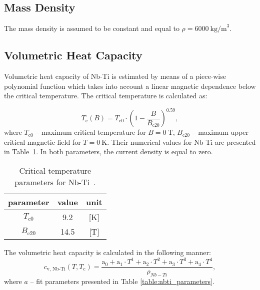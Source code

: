 
\subsection{Mass Density}
The mass density is assumed to be constant and equal to $\rho = 6000~\text{kg/m}^{3}$.

\subsection{Volumetric Heat Capacity}
Volumetric heat capacity of Nb-Ti is estimated by means of a piece-wise polynomial function which takes into account a linear magnetic dependence below the critical temperature. The critical temperature is calculated as: 

\begin{equation}
    T_\text{c}(B) = T_\text{c0}\cdot(1-\frac{B}{B_\text{c20}})^{0.59},
    \label{eqn:critical_temperature_appendix}
\end{equation}
where $T_\text{c0}$ -- maximum critical temperature for $B=0~\text{T}$, $B_\text{c20}$ -- maximum upper critical magnetic field for $T=0~\text{K}$. Their numerical values for Nb-Ti are presented in Table~\ref{table: appendix_nb_ti_crit_temp_params}. In both parameters, the current density is equal to zero. 

\newpage
\begin{table}[H]
    \caption{Critical temperature parameters for Nb-Ti~\cite{empirical_scaling_formulas_for_critical_current}.} 
    \vspace{-1.em} 
    \fontsize{10}{10}
    \selectfont 
    \renewcommand{\arraystretch}{1.5}
    \begin{center}
        \begin{tabular}{ ccc }  
        \hline
        parameter & value & unit \\
        \hline
        $T_\text{c0}$ & 9.2 & [K] \\
        $B_\text{c20}$ & 14.5 & [T] \\
        \hline 
        \end{tabular}
    \end{center}  
     \label{table: appendix_nb_ti_crit_temp_params} 
 \end{table}

The volumetric heat capacity is calculated in the following manner: 
\begin{equation}
    c_\text{v, Nb-Ti}(T, T_\text{c}) = \frac{\text{a}_0 + \text{a}_1\cdot T^{1} + \text{a}_2\cdot T^{2} + \text{a}_3\cdot T^{3}+ \text{a}_4\cdot T^{4}} {\rho_{Nb-Ti}},
\end{equation}
where $a$ -- fit parameters presented in Table \ref{table:nbti_parameters}.

